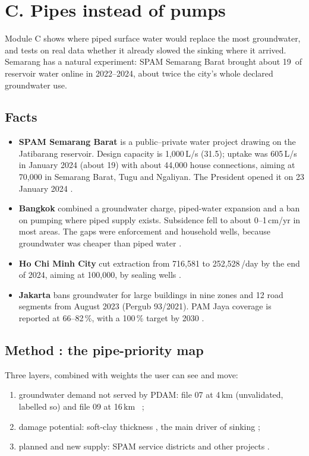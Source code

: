 \section{C. Pipes instead of pumps}\label{sec:c}

\begin{inshort}
Module C shows where piped surface water would replace the most groundwater, and tests on real data
whether it already slowed the sinking where it arrived. Semarang has a natural experiment: SPAM Semarang
Barat brought about 19\Mmyr\ of reservoir water online in 2022--2024, about twice the city's whole
declared groundwater use.
\end{inshort}

\subsection{Facts}

\begin{itemize}
\item \textbf{SPAM Semarang Barat} is a public--private water project drawing on the Jatibarang reservoir.
  Design capacity is 1,000\,L/s (31.5\Mmyr); uptake was 605\,L/s in January 2024 (about 19\Mmyr) with
  about 44,000 house connections, aiming at 70,000 in Semarang Barat, Tugu and Ngaliyan. The President
  opened it on 23 January 2024 \cite{setkab,ekon,investortrust} \Off.
\item \textbf{Bangkok} combined a groundwater charge, piped-water expansion and a ban on pumping where
  piped supply exists. Subsidence fell to about 0--1\,cm/yr in most areas. The gaps were enforcement and
  household wells, because groundwater was cheaper than piped water \cite{mekong,iges,wbbangkok}.
\item \textbf{Ho Chi Minh City} cut extraction from 716,581 to 252,528\,\mthree/day by the end of 2024,
  aiming at 100,000, by sealing wells \cite{tuoitre} \Wk.
\item \textbf{Jakarta} bans groundwater for large buildings in nine zones and 12 road segments from August
  2023 (Pergub 93/2021). PAM Jaya coverage is reported at 66--82\,\%, with a 100\,\% target by 2030
  \cite{tirto,koranjkt} \Wk.
\end{itemize}

\subsection{Method : the pipe-priority map}

Three layers, combined with weights the user can see and move:
\begin{enumerate}
\item groundwater demand not served by PDAM: file 07 at 4\,km (unvalidated, labelled so) and file 09 at
  16\,km \Tst\ \cite{exp07,exp09};
\item damage potential: soft-clay thickness  \Mea, the main driver of sinking \cite{exp14};
\item planned and new supply: SPAM service districts and other projects .
\end{enumerate}

